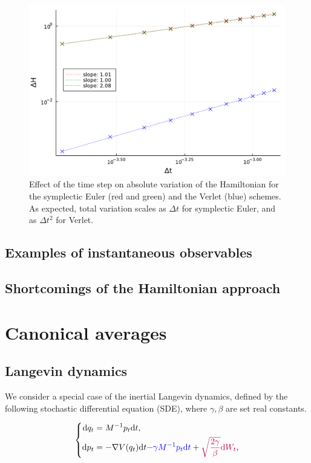     \begin{figure}[htbp]
        \begin{center}
          \includegraphics[width=0.7\linewidth]{figures/chapter1/hamiltonian_conservation.pdf}
          \caption{ \label{fig:hamiltonian_conservation}
            Effect of the time step on absolute variation of the Hamiltonian for the symplectic Euler (red and green) and the Verlet (blue) schemes. As expected, total variation scales as $\Delta t$ for symplectic Euler, and as $\Delta t^2$ for Verlet.
          }
        \end{center}
      \end{figure}

    \subsection{Examples of instantaneous observables}
        
    \subsection{Shortcomings of the Hamiltonian approach}

\section{Canonical averages}

\subsection{Langevin dynamics}
We consider a special case of the inertial Langevin dynamics, defined by the following stochastic differential equation (SDE), where $\gamma, \beta$ are set real constants.

\begin{equation}
    \label{Langevin}
    \left\{\begin{aligned}
        \text dq_t&=M^{-1}p_t\text{d}t,\\
        \text dp_t&= -\nabla V(q_t)\text{d}t \textcolor{blue}{-\gamma M^{-1}p_t\text{d}t}+\textcolor{purple}{\sqrt{\frac{2\gamma}\beta}\text dW_t},
    \end{aligned}\right.
\end{equation}

